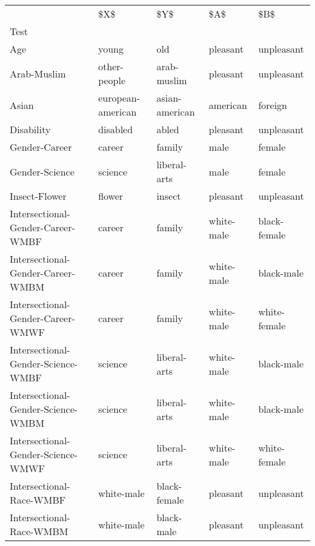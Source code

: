 \begin{tabular}{lllll}
\toprule
{} &                \$X\$ &               \$Y\$ &          \$A\$ &            \$B\$ \\
Test                               &                    &                   &              &                \\
\midrule
Age                                &              young &               old &     pleasant &     unpleasant \\
Arab-Muslim                        &       other-people &       arab-muslim &     pleasant &     unpleasant \\
Asian                              &  european-american &    asian-american &     american &        foreign \\
Disability                         &           disabled &             abled &     pleasant &     unpleasant \\
Gender-Career                      &             career &            family &         male &         female \\
Gender-Science                     &            science &      liberal-arts &         male &         female \\
Insect-Flower                      &             flower &            insect &     pleasant &     unpleasant \\
Intersectional-Gender-Career-WMBF  &             career &            family &   white-male &   black-female \\
Intersectional-Gender-Career-WMBM  &             career &            family &   white-male &     black-male \\
Intersectional-Gender-Career-WMWF  &             career &            family &   white-male &   white-female \\
Intersectional-Gender-Science-WMBF &            science &      liberal-arts &   white-male &     black-male \\
Intersectional-Gender-Science-WMBM &            science &      liberal-arts &   white-male &     black-male \\
Intersectional-Gender-Science-WMWF &            science &      liberal-arts &   white-male &   white-female \\
Intersectional-Race-WMBF           &         white-male &      black-female &     pleasant &     unpleasant \\
Intersectional-Race-WMBM           &         white-male &        black-male &     pleasant &     unpleasant \\

\end{tabular}

